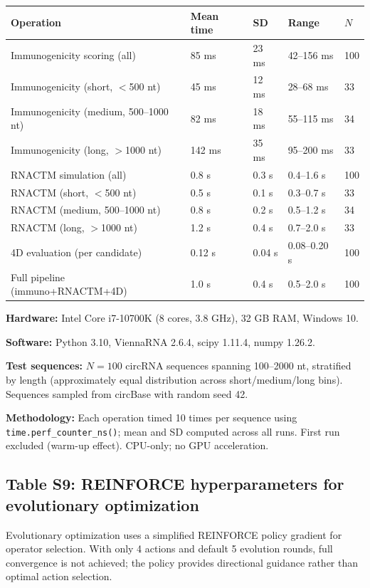 \begin{tabular}{lllll}
\toprule
\textbf{Operation} & \textbf{Mean time} & \textbf{SD} & \textbf{Range} & \textbf{$N$} \\
\midrule
Immunogenicity scoring (all) & 85 ms & 23 ms & 42--156 ms & 100 \\
Immunogenicity (short, $<$500 nt) & 45 ms & 12 ms & 28--68 ms & 33 \\
Immunogenicity (medium, 500--1000 nt) & 82 ms & 18 ms & 55--115 ms & 34 \\
Immunogenicity (long, $>$1000 nt) & 142 ms & 35 ms & 95--200 ms & 33 \\
RNACTM simulation (all) & 0.8 s & 0.3 s & 0.4--1.6 s & 100 \\
RNACTM (short, $<$500 nt) & 0.5 s & 0.1 s & 0.3--0.7 s & 33 \\
RNACTM (medium, 500--1000 nt) & 0.8 s & 0.2 s & 0.5--1.2 s & 34 \\
RNACTM (long, $>$1000 nt) & 1.2 s & 0.4 s & 0.7--2.0 s & 33 \\
4D evaluation (per candidate) & 0.12 s & 0.04 s & 0.08--0.20 s & 100 \\
Full pipeline (immuno+RNACTM+4D) & 1.0 s & 0.4 s & 0.5--2.0 s & 100 \\
\bottomrule
\end{tabular}

\textbf{Hardware:} Intel Core i7-10700K (8 cores, 3.8 GHz), 32 GB RAM, Windows 10.

\textbf{Software:} Python 3.10, ViennaRNA 2.6.4, scipy 1.11.4, numpy 1.26.2.

\textbf{Test sequences:} $N{=}100$ circRNA sequences spanning 100--2000 nt, stratified by length (approximately equal distribution across short/medium/long bins). Sequences sampled from circBase with random seed 42.

\textbf{Methodology:} Each operation timed 10 times per sequence using \texttt{time.perf\_counter\_ns()}; mean and SD computed across all runs. First run excluded (warm-up effect). CPU-only; no GPU acceleration.

\subsection*{Table S9: REINFORCE hyperparameters for evolutionary optimization}

\small Evolutionary optimization uses a simplified REINFORCE policy gradient for operator selection. With only 4 actions and default 5 evolution rounds, full convergence is not achieved; the policy provides directional guidance rather than optimal action selection.

